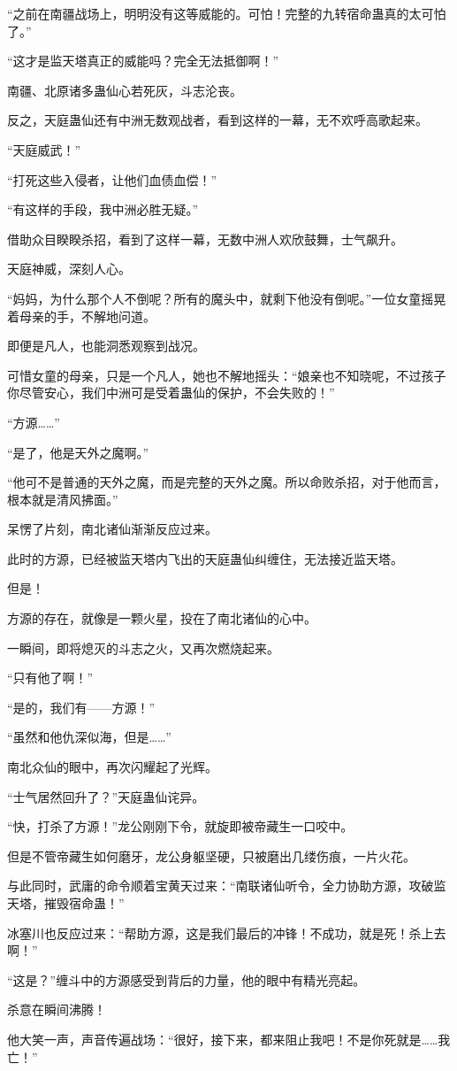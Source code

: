 \begin{this_body}
“之前在南疆战场上，明明没有这等威能的。可怕！完整的九转宿命蛊真的太可怕了。”

“这才是监天塔真正的威能吗？完全无法抵御啊！”

南疆、北原诸多蛊仙心若死灰，斗志沦丧。

反之，天庭蛊仙还有中洲无数观战者，看到这样的一幕，无不欢呼高歌起来。

“天庭威武！”

“打死这些入侵者，让他们血债血偿！”

“有这样的手段，我中洲必胜无疑。”

借助众目睽睽杀招，看到了这样一幕，无数中洲人欢欣鼓舞，士气飙升。

天庭神威，深刻人心。

“妈妈，为什么那个人不倒呢？所有的魔头中，就剩下他没有倒呢。”一位女童摇晃着母亲的手，不解地问道。

即便是凡人，也能洞悉观察到战况。

可惜女童的母亲，只是一个凡人，她也不解地摇头：“娘亲也不知晓呢，不过孩子你尽管安心，我们中洲可是受着蛊仙的保护，不会失败的！”

“方源……”

“是了，他是天外之魔啊。”

“他可不是普通的天外之魔，而是完整的天外之魔。所以命败杀招，对于他而言，根本就是清风拂面。”

呆愣了片刻，南北诸仙渐渐反应过来。

此时的方源，已经被监天塔内飞出的天庭蛊仙纠缠住，无法接近监天塔。

但是！

方源的存在，就像是一颗火星，投在了南北诸仙的心中。

一瞬间，即将熄灭的斗志之火，又再次燃烧起来。

“只有他了啊！”

“是的，我们有——方源！”

“虽然和他仇深似海，但是……”

南北众仙的眼中，再次闪耀起了光辉。

“士气居然回升了？”天庭蛊仙诧异。

“快，打杀了方源！”龙公刚刚下令，就旋即被帝藏生一口咬中。

但是不管帝藏生如何磨牙，龙公身躯坚硬，只被磨出几缕伤痕，一片火花。

与此同时，武庸的命令顺着宝黄天过来：“南联诸仙听令，全力协助方源，攻破监天塔，摧毁宿命蛊！”

冰塞川也反应过来：“帮助方源，这是我们最后的冲锋！不成功，就是死！杀上去啊！”

“这是？”缠斗中的方源感受到背后的力量，他的眼中有精光亮起。

杀意在瞬间沸腾！

他大笑一声，声音传遍战场：“很好，接下来，都来阻止我吧！不是你死就是……我亡！”

\end{this_body}

